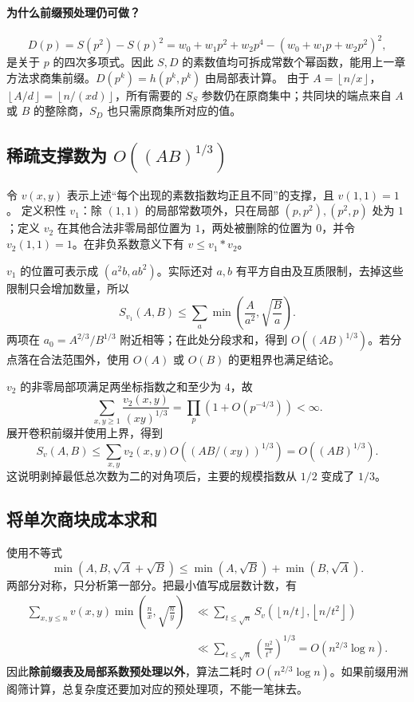 \documentclass[UTF8,a4paper,11pt,twoside,openright,fontset=fandol]{ctexbook}
\theoremstyle{definition}
\newcommand{\floor}[1]{\left\lfloor #1\right\rfloor}
\begin{document}
\paragraph{为什么前缀预处理仍可做？}
\[
 D(p)=S(p^2)-S(p)^2
 =w_0+w_1p^2+w_2p^4-(w_0+w_1p+w_2p^2)^2,
\]
是关于 $p$ 的四次多项式。因此 $S,D$ 的素数值均可拆成常数个幂函数，能用上一章方法求商集前缀。$D(p^k)=h(p^k,p^k)$ 由局部表计算。
由于 $A=\floor{n/x}$，$\floor{A/d}=\floor{n/(xd)}$，所有需要的 $S_S$ 参数仍在原商集中；共同块的端点来自 $A$ 或 $B$ 的整除商，$S_D$ 也只需原商集所对应的值。

\subsection{稀疏支撑数为 \texorpdfstring{$O((AB)^{1/3})$}{O((AB)1/3)}}
令 $v(x,y)$ 表示上述“每个出现的素数指数均正且不同”的支撑，且 $v(1,1)=1$。
定义积性 $v_1$：除 $(1,1)$ 的局部常数项外，只在局部 $(p,p^2),(p^2,p)$ 处为 $1$；定义 $v_2$ 在其他合法非零局部位置为 $1$，两处被删除的位置为 $0$，并令 $v_2(1,1)=1$。在非负系数意义下有 $v\le v_1*v_2$。

$v_1$ 的位置可表示成 $(a^2b,ab^2)$。实际还对 $a,b$ 有平方自由及互质限制，去掉这些限制只会增加数量，所以
\[
 S_{v_1}(A,B)\le\sum_a\min\left(\frac A{a^2},\sqrt{\frac Ba}\right).
\]
两项在 $a_0=A^{2/3}/B^{1/3}$ 附近相等；在此处分段求和，得到 $O((AB)^{1/3})$。若分点落在合法范围外，使用 $O(A)$ 或 $O(B)$ 的更粗界也满足结论。

$v_2$ 的非零局部项满足两坐标指数之和至少为 $4$，故
\[
 \sum_{x,y\ge1}\frac{v_2(x,y)}{(xy)^{1/3}}
 =\prod_p\left(1+O(p^{-4/3})\right)<\infty.
\]
展开卷积前缀并使用上界，得到
\[
 S_v(A,B)\le\sum_{x,y}v_2(x,y)
 O\!\left((AB/(xy))^{1/3}\right)=O((AB)^{1/3}).
\]
这说明剥掉最低总次数为二的对角项后，主要的规模指数从 $1/2$ 变成了 $1/3$。

\subsection{将单次商块成本求和}
使用不等式
\[
 \min(A,B,\sqrt A+\sqrt B)
 \le\min(A,\sqrt B)+\min(B,\sqrt A).
\]
两部分对称，只分析第一部分。把最小值写成层数计数，有
\[
\begin{aligned}
 \sum_{x,y\le n}v(x,y)\min\left(\frac nx,\sqrt{\frac ny}\right)
 &\ll\sum_{t\le\sqrt n}S_v(\floor{n/t},\floor{n/t^2})\\
 &\ll\sum_{t\le\sqrt n}\left(\frac{n^2}{t^3}\right)^{1/3}
 =O(n^{2/3}\log n).
\end{aligned}
\]
因此\textbf{除前缀表及局部系数预处理以外}，算法二耗时 $O(n^{2/3}\log n)$。如果前缀用洲阁筛计算，总复杂度还要加对应的预处理项，不能一笔抹去。
\end{document}
